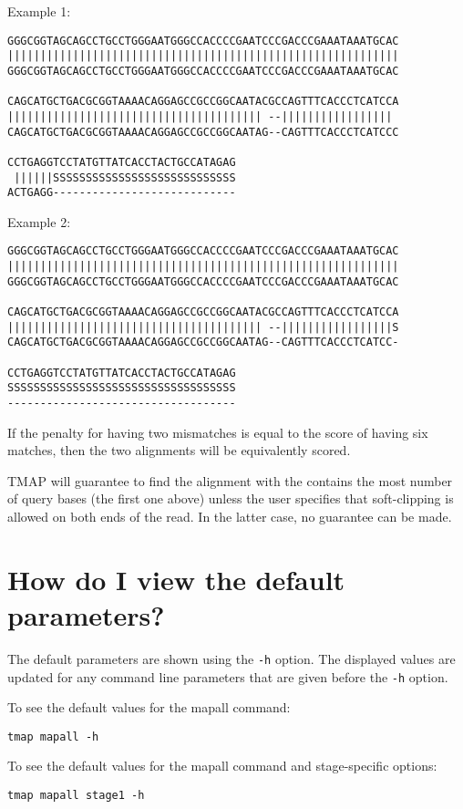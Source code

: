\documentclass[a4paper,12pt]{book}
\newcommand{\TT}[1]{{\tt #1}} %
\begin{document}
Example 1:
\begin{verbatim}
GGGCGGTAGCAGCCTGCCTGGGAATGGGCCACCCCGAATCCCGACCCGAAATAAATGCAC
||||||||||||||||||||||||||||||||||||||||||||||||||||||||||||
GGGCGGTAGCAGCCTGCCTGGGAATGGGCCACCCCGAATCCCGACCCGAAATAAATGCAC

CAGCATGCTGACGCGGTAAAACAGGAGCCGCCGGCAATACGCCAGTTTCACCCTCATCCA
||||||||||||||||||||||||||||||||||||||| --||||||||||||||||| 
CAGCATGCTGACGCGGTAAAACAGGAGCCGCCGGCAATAG--CAGTTTCACCCTCATCCC

CCTGAGGTCCTATGTTATCACCTACTGCCATAGAG
 ||||||SSSSSSSSSSSSSSSSSSSSSSSSSSSS
ACTGAGG----------------------------
\end{verbatim}

Example 2:
\begin{verbatim}
GGGCGGTAGCAGCCTGCCTGGGAATGGGCCACCCCGAATCCCGACCCGAAATAAATGCAC
||||||||||||||||||||||||||||||||||||||||||||||||||||||||||||
GGGCGGTAGCAGCCTGCCTGGGAATGGGCCACCCCGAATCCCGACCCGAAATAAATGCAC

CAGCATGCTGACGCGGTAAAACAGGAGCCGCCGGCAATACGCCAGTTTCACCCTCATCCA
||||||||||||||||||||||||||||||||||||||| --|||||||||||||||||S
CAGCATGCTGACGCGGTAAAACAGGAGCCGCCGGCAATAG--CAGTTTCACCCTCATCC-

CCTGAGGTCCTATGTTATCACCTACTGCCATAGAG
SSSSSSSSSSSSSSSSSSSSSSSSSSSSSSSSSSS
-----------------------------------
\end{verbatim}

If the penalty for having two mismatches is equal to the score of having six matches, then the two alignments will be equivalently scored.

TMAP will guarantee to find the alignment with the contains the most number of query bases (the first one above) unless the user specifies that soft-clipping is allowed on both ends of the read.
In the latter case, no guarantee can be made.

\section{How do I view the default parameters?}

The default parameters are shown using the \TT{-h} option.
The displayed values are updated for any command line parameters that are given before the \TT{-h} option.

To see the default values for the mapall command:
\begin{verbatim}
tmap mapall -h
\end{verbatim}

To see the default values for the mapall command and stage-specific options:
\begin{verbatim}
tmap mapall stage1 -h
\end{verbatim}
\end{document}
